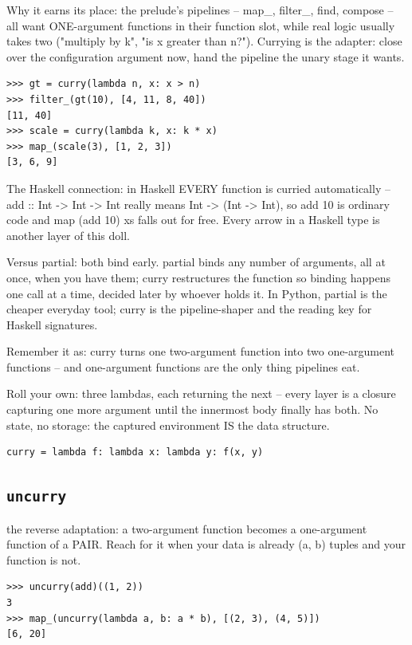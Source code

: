 \documentclass[10pt,letterpaper]{book}
\begin{document}
Why it earns its place: the prelude's pipelines -- map\_, filter\_, find, compose -- all want ONE-argument functions in their function slot, while real logic usually takes two ("multiply by k", "is x greater than n?"). Currying is the adapter: close over the configuration argument now, hand the pipeline the unary stage it wants.

\begin{lstlisting}[style=ex]
>>> gt = curry(lambda n, x: x > n)
>>> filter_(gt(10), [4, 11, 8, 40])
[11, 40]
>>> scale = curry(lambda k, x: k * x)
>>> map_(scale(3), [1, 2, 3])
[3, 6, 9]
\end{lstlisting}

The Haskell connection: in Haskell EVERY function is curried automatically -- add :: Int -> Int -> Int really means Int -> (Int -> Int), so add 10 is ordinary code and map (add 10) xs falls out for free. Every arrow in a Haskell type is another layer of this doll.


Versus partial: both bind early. partial binds any number of arguments, all at once, when you have them; curry restructures the function so binding happens one call at a time, decided later by whoever holds it. In Python, partial is the cheaper everyday tool; curry is the pipeline-shaper and the reading key for Haskell signatures.


Remember it as: curry turns one two-argument function into two one-argument functions -- and one-argument functions are the only thing pipelines eat.


Roll your own: three lambdas, each returning the next -- every layer is a closure capturing one more argument until the innermost body finally has both. No state, no storage: the captured environment IS the data structure.

\begin{lstlisting}[style=ex]
curry = lambda f: lambda x: lambda y: f(x, y)
\end{lstlisting}
\subsection{\texttt{uncurry}}\label{def:uncurry}
the reverse adaptation: a two-argument function becomes a one-argument function of a PAIR. Reach for it when your data is already (a, b) tuples and your function is not.
\begin{lstlisting}[style=ex]
>>> uncurry(add)((1, 2))
3
>>> map_(uncurry(lambda a, b: a * b), [(2, 3), (4, 5)])
[6, 20]
\end{lstlisting}
\end{document}
